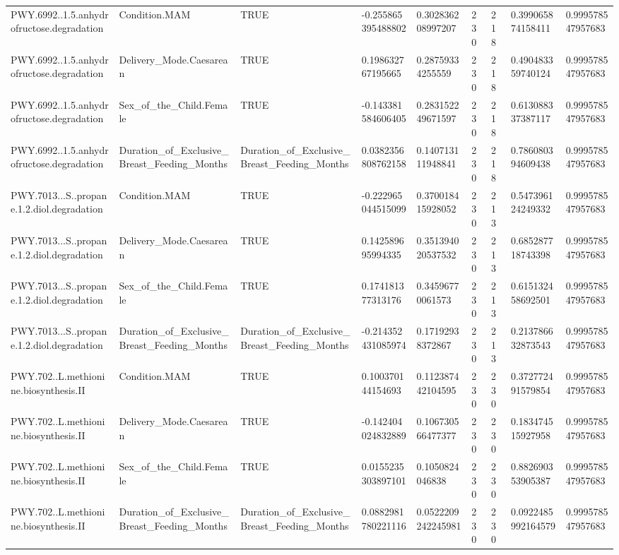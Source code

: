 \begin{longtable}{lllllllll}
PWY.6992..1.5.anhydrofructose.degradation & Condition.MAM & TRUE & -0.255865395488802 & 0.302836208997207 & 230 & 218 & 0.399065874158411 & 0.999578547957683 \\
PWY.6992..1.5.anhydrofructose.degradation & Delivery\_Mode.Caesarean & TRUE & 0.198632767195665 & 0.28759334255559 & 230 & 218 & 0.490483359740124 & 0.999578547957683 \\
PWY.6992..1.5.anhydrofructose.degradation & Sex\_of\_the\_Child.Female & TRUE & -0.143381584606405 & 0.283152249671597 & 230 & 218 & 0.613088337387117 & 0.999578547957683 \\
PWY.6992..1.5.anhydrofructose.degradation & Duration\_of\_Exclusive\_Breast\_Feeding\_Months & Duration\_of\_Exclusive\_Breast\_Feeding\_Months & 0.0382356808762158 & 0.140713111948841 & 230 & 218 & 0.786080394609438 & 0.999578547957683 \\
PWY.7013...S..propane.1.2.diol.degradation & Condition.MAM & TRUE & -0.222965044515099 & 0.370018415928052 & 230 & 213 & 0.547396124249332 & 0.999578547957683 \\
PWY.7013...S..propane.1.2.diol.degradation & Delivery\_Mode.Caesarean & TRUE & 0.142589695994335 & 0.351394020537532 & 230 & 213 & 0.685287718743398 & 0.999578547957683 \\
PWY.7013...S..propane.1.2.diol.degradation & Sex\_of\_the\_Child.Female & TRUE & 0.174181377313176 & 0.34596770061573 & 230 & 213 & 0.615132458692501 & 0.999578547957683 \\
PWY.7013...S..propane.1.2.diol.degradation & Duration\_of\_Exclusive\_Breast\_Feeding\_Months & Duration\_of\_Exclusive\_Breast\_Feeding\_Months & -0.214352431085974 & 0.17192938372867 & 230 & 213 & 0.213786632873543 & 0.999578547957683 \\
PWY.702..L.methionine.biosynthesis.II & Condition.MAM & TRUE & 0.100370144154693 & 0.112387442104595 & 230 & 230 & 0.372772491579854 & 0.999578547957683 \\
PWY.702..L.methionine.biosynthesis.II & Delivery\_Mode.Caesarean & TRUE & -0.142404024832889 & 0.106730566477377 & 230 & 230 & 0.183474515927958 & 0.999578547957683 \\
PWY.702..L.methionine.biosynthesis.II & Sex\_of\_the\_Child.Female & TRUE & 0.0155235303897101 & 0.1050824046838 & 230 & 230 & 0.882690353905387 & 0.999578547957683 \\
PWY.702..L.methionine.biosynthesis.II & Duration\_of\_Exclusive\_Breast\_Feeding\_Months & Duration\_of\_Exclusive\_Breast\_Feeding\_Months & 0.0882981780221116 & 0.0522209242245981 & 230 & 230 & 0.0922485992164579 & 0.999578547957683 \\

\end{longtable}

